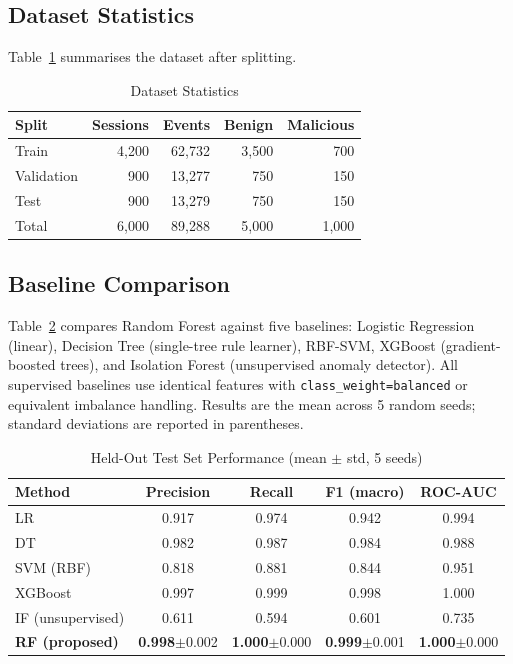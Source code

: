 \label{sec:exp}

\subsection{Dataset Statistics}

Table~\ref{tab:datastats} summarises the dataset after splitting.

\begin{table}[!t]
  \caption{Dataset Statistics}
  \label{tab:datastats}
  \centering
  \begin{tabular}{lrrrr}
    \hline
    Split & Sessions & Events & Benign & Malicious \\
    \hline
    Train      & 4{,}200 & 62{,}732 & 3{,}500 & 700 \\
    Validation &    900  & 13{,}277 &    750  & 150 \\
    Test       &    900  & 13{,}279 &    750  & 150 \\
    \hline
    Total      & 6{,}000 & 89{,}288 & 5{,}000 & 1{,}000 \\
    \hline
  \end{tabular}
\end{table}

\subsection{Baseline Comparison}

Table~\ref{tab:baseline} compares Random Forest against five baselines: Logistic Regression
(linear), Decision Tree (single-tree rule learner), RBF-SVM, XGBoost (gradient-boosted
trees), and Isolation Forest (unsupervised anomaly detector). All supervised baselines use
identical features with \texttt{class\_weight=balanced} or equivalent imbalance handling.
Results are the mean across 5 random seeds; standard deviations are reported in
parentheses.

\begin{table}[!t]
  \caption{Held-Out Test Set Performance (mean $\pm$ std, 5 seeds)}
  \label{tab:baseline}
  \centering
  \begin{tabular}{lcccc}
    \hline
    Method & Precision & Recall & F1 (macro) & ROC-AUC \\
    \hline
    LR                       & 0.917 & 0.974 & 0.942 & 0.994 \\
    DT                       & 0.982 & 0.987 & 0.984 & 0.988 \\
    SVM (RBF)                & 0.818 & 0.881 & 0.844 & 0.951 \\
    XGBoost                  & 0.997 & 0.999 & 0.998 & 1.000 \\
    IF (unsupervised)        & 0.611 & 0.594 & 0.601 & 0.735 \\
    \textbf{RF (proposed)}   & \textbf{0.998}$\pm$0.002 &
                               \textbf{1.000}$\pm$0.000 &
                               \textbf{0.999}$\pm$0.001 &
                               \textbf{1.000}$\pm$0.000 \\
    \hline
  \end{tabular}
\end{table}

